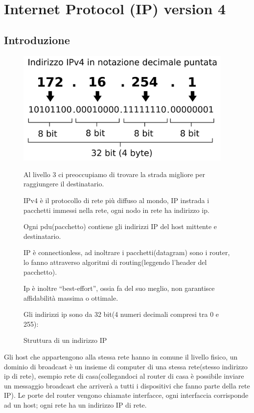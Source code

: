 \section{Internet Protocol (IP) version 4}

\subsection{Introduzione}
\begin{figure}[h!]
    \begin{minipage}{0.45\textwidth}
        \centering
        \includegraphics[width=0.95\textwidth]{images/indirizzoip.png}
        \caption{Struttura di un indirizzo IP}
        \label{fig:indirizzoip}
    \end{minipage}\hfill
    \begin{minipage}{0.52\textwidth}
        Al livello 3 ci preoccupiamo di trovare la strada migliore per raggiungere il destinatario.

        IPv4 è il protocollo di rete più diffuso al mondo, IP instrada i pacchetti immessi nella rete, ogni nodo in rete ha indirizzo ip.

        Ogni pdu(pacchetto) contiene gli indirizzi IP del host mittente e destinatario.
        
        IP è connectionless, ad inoltrare i pacchetti(datagram) sono i router, lo fanno attraverso algoritmi di routing(leggendo l’header del pacchetto). 

        Ip è inoltre “best-effort”, ossia fa del suo meglio, non garantisce affidabilità massima o ottimale.

        Gli indirizzi ip sono da 32 bit(4 numeri decimali compresi tra 0 e 255):
    \end{minipage}
\end{figure}

Gli host che appartengono alla stessa rete hanno in comune il livello fisico,
un dominio di broadcast è un insieme di computer di una stessa rete(stesso indirizzo ip di rete), esempio rete di casa(collegandoci al router di casa è possibile inviare un messaggio broadcast che arriverà a tutti i dispositivi che fanno parte della rete IP).
Le porte del router vengono chiamate interfacce, ogni interfaccia corrisponde ad un host;
ogni rete ha un indirizzo IP di rete.

